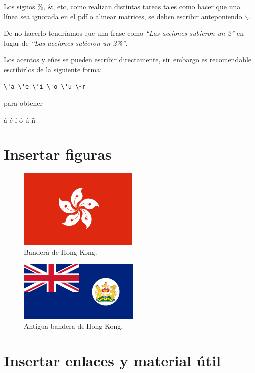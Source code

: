 \documentclass[letterpaper,twoside]{article}
\begin{document}
Los signos \%, \&, etc, como realizan distintas tareas tales como hacer que una l\'inea sea ignorada en el pdf o alinear matrices, se deben escribir anteponiendo $\backslash$.

De no hacerlo tendr\'iamos que una frase como \emph{``Las acciones subieron un 2''} en lugar de \emph{``Las acciones subieron un 2\%''}.

Los acentos y e\~nes se pueden escribir directamente, sin embargo es recomendable escribirlos de la siguiente forma:

\begin{verbatim}
\'a \'e \'i \'o \'u \~n
\end{verbatim}

para obtener
\begin{center}
\'a \'e \'i \'o \'u \~n
\end{center}

\newpage

\section{Insertar figuras}

\begin{figure}[h]
\centering
\includegraphics[scale=1]{Flag_of_Hong_Kong.png} 
\caption{\textsf{Bandera de Hong Kong.}}
\end{figure}

\begin{figure}[h]
\centering
\includegraphics[scale=1]{Flag_of_Hong_Kong_(1959-1997).png} 
\caption{\textsf{Antigua bandera de Hong Kong.}}
\end{figure}


\newpage

\section{Insertar enlaces y material \'util}
\end{document}
